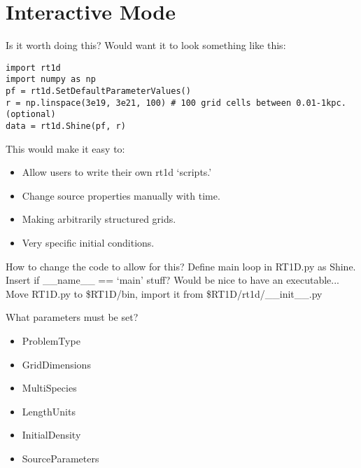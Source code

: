 \documentclass[letterpaper,titlepage,12pt]{article}
\numberwithin{equation}{section}
\begin{document}
\section{Interactive Mode}
Is it worth doing this?  Would want it to look something like this:

\begin{verbatim}
import rt1d
import numpy as np
pf = rt1d.SetDefaultParameterValues()
r = np.linspace(3e19, 3e21, 100) # 100 grid cells between 0.01-1kpc. (optional)
data = rt1d.Shine(pf, r)    
\end{verbatim}    

This would make it easy to:
\begin{itemize}
    \item Allow users to write their own rt1d `scripts.'
    \item Change source properties manually with time.
    \item Making arbitrarily structured grids.
    \item Very specific initial conditions.
\end{itemize}    

How to change the code to allow for this?
Define main loop in RT1D.py as Shine.  Insert if __name__ == `main' stuff?
Would be nice to have an executable...
Move RT1D.py to \$RT1D/bin, import it from \$RT1D/rt1d/__init__.py

What parameters must be set?
\begin{itemize}
    \item ProblemType
    \item GridDimensions
    \item MultiSpecies
    \item LengthUnits
    \item InitialDensity
    \item SourceParameters
\end{itemize}

\newpage


\end{document}
